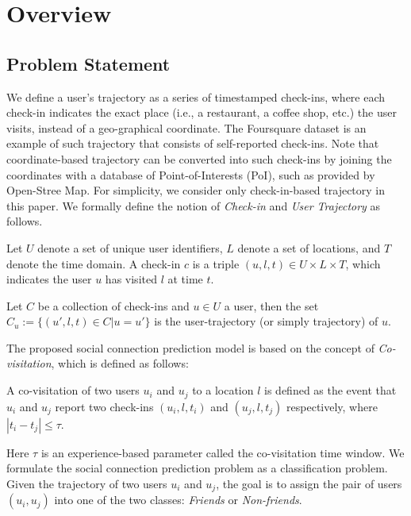 \section{Overview} \label{sec:overview}

\subsection{Problem Statement} \label{sec:problem}

We define a user's trajectory as a series of timestamped check-ins, where each check-in indicates the exact place (i.e., a restaurant, a coffee shop, etc.) the user visits, instead of a geo-graphical coordinate. The Foursquare dataset is an example of such trajectory that consists of self-reported check-ins. Note that coordinate-based trajectory can be converted into such check-ins by joining the coordinates with a database of Point-of-Interests (PoI), such as provided by Open-Stree Map. For simplicity, we consider only check-in-based trajectory in this paper. We formally define the notion of \textit{Check-in} and \textit{User Trajectory} as follows.

\begin{definition}[Check-in]
Let $U$ denote a set of unique user identifiers, $L$ denote a set of locations, and $T$ denote the time domain. A check-in $c$ is a triple $(u, l, t) \in U \times L \times T$, which indicates the user $u$ has visited $l$ at time $t$.
\end{definition}

\begin{definition}
Let $C$ be a collection of check-ins and $u \in U$ a user, then the set $C_u := \{ (u', l, t) \in C | u = u'\}$ is the user-trajectory (or simply trajectory) of $u$.
\end{definition}

The proposed social connection prediction model is based on the concept of \textit{Co-visitation}, which is defined as follows: 

\begin{definition}[Co-visitation]
A co-visitation of two users $u_i$ and $u_j$ to a location $l$ is defined as the event that $u_i$ and $u_j$ report two check-ins $(u_i, l, t_i)$ and $(u_j, l, t_j)$ respectively, where $| t_i - t_j| \leq \tau$.
\end{definition}

Here $\tau$ is an experience-based parameter called the co-visitation time window. We formulate the social connection prediction problem as a classification problem. Given the trajectory of two users $u_i$ and $u_j$, the goal is to assign the pair of users $(u_i, u_j)$ into one of the two classes: \textit{Friends} or \textit{Non-friends}. 

